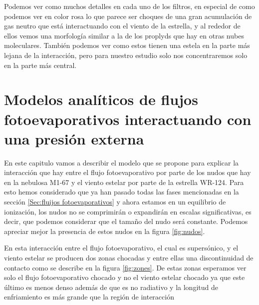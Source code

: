 \documentclass{book}
\begin{document}
Podemos ver como muchos detalles en cada uno de los filtros, en especial de como podemos ver en color rosa lo que parece ser choques de una gran acumulación de gas neutro que está interactuando con el viento de la estrella, y al rededor de ellos vemos una morfología similar a la de los proplyds que hay en otras nubes moleculares. También podemos ver como estos tienen una estela en la parte más lejana de la interacción, pero para nuestro estudio solo nos concentraremos solo en la parte más central.

\chapter{Modelos analíticos de flujos fotoevaporativos interactuando con una presión externa}

En este capitulo vamos a describir el modelo que se propone para explicar la interacción que hay entre el flujo fotoevaporativo por parte de los nudos que hay en la nebulosa M1-67 y el viento estelar por parte de la estrella WR-124. Para esto hemos considerado que ya han pasado todas las fases mencionadas en la sección \ref{Sec:fluijos fotoevaporativos} y ahora estamos en un equilibrio de ionización, los nudos no se comprimirán o expandirán en escalas significativas, es decir, que podemos considerar que el tamaño del nudo será constante. Podemos apreciar mejor la presencia de estos nudos en la figura \ref{fig:nudos}.

En esta interacción entre el flujo fotoevaporativo, el cual es supersónico, y el viento estelar se producen dos zonas chocadas y entre ellas una discontinuidad de contacto como se describe en la figura \ref{fig:zones}. De estas zonas esperamos ver solo el flujo fotoevaporativo chocado y no el viento estelar chocado ya que este último es menos denso además de que es no radiativo y la longitud de enfriamiento es más grande que la región de interacción
\end{document}

